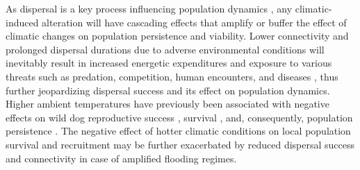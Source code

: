 \documentclass[abstract=on,10pt,a4paper,bibliography=totocnumbered]{article}
\begin{document}

As dispersal is a key process influencing population dynamics
\citep{Hanski.1999, Clobert.2012}, any climatic-induced alteration will have
cascading effects that amplify or buffer the effect of climatic changes on
population persistence and viability. Lower connectivity and prolonged
dispersal durations due to adverse environmental conditions will inevitably
result in increased energetic expenditures and exposure to various threats such
as predation, competition, human encounters, and diseases \citep{Alberts.1995,
Yoder.2004, Stamps.2005, Bonte.2012}, thus further jeopardizing dispersal
success and its effect on population dynamics. Higher ambient temperatures have
previously been associated with negative effects on wild dog reproductive
success \citep{Woodroffe.2017, Abrahms.2022}, survival \citep{Rabaiotti.2021},
and, consequently, population persistence \citep{Rabaiotti.2023}. The negative
effect of hotter climatic conditions on local population survival and
recruitment may be further exacerbated by reduced dispersal success and
connectivity in case of amplified flooding regimes.
\end{document}
